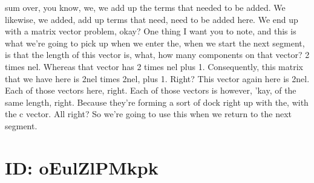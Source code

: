 \documentclass[10pt]{article}
\begin{document}
{sum over, you know, we, we add up the terms that needed to be added. We likewise, we added, add up terms that need, need to be added here. We end up with a matrix vector problem, okay? One thing I want you to note, and this is what we're going to pick up when we enter the, when we start the next segment, is that the length of this vector is, what, how many components on that vector? 2 times nel. Whereas that vector has 2 times nel plus 1. Consequently, this matrix that we have here is 2nel times 2nel, plus 1. Right? This vector again here is 2nel. Each of those vectors here, right. Each of those vectors is however, 'kay, of the same length, right. Because they're forming a sort of dock right up with the, with the c vector. All right? So we're going to use this when we return to the next segment.

\section*{ID: oEulZlPMkpk}
}
\end{document}
